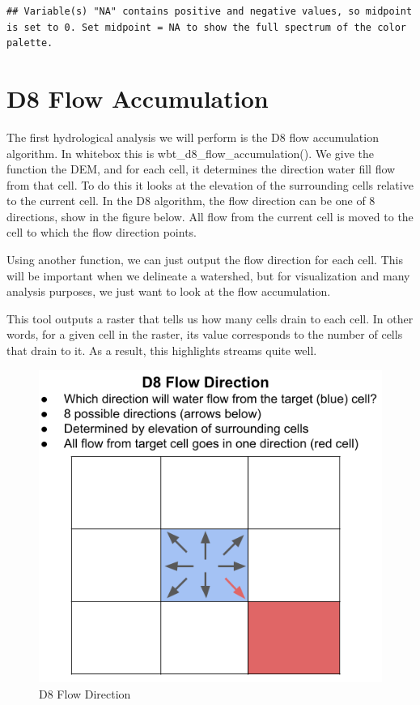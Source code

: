 \documentclass[
]{book}
\begin{document}
\begin{verbatim}
## Variable(s) "NA" contains positive and negative values, so midpoint is set to 0. Set midpoint = NA to show the full spectrum of the color palette.
\end{verbatim}

\hypertarget{d8-flow-accumulation}{%
\section{D8 Flow Accumulation}\label{d8-flow-accumulation}}

The first hydrological analysis we will perform is the D8 flow accumulation algorithm. In whitebox this is wbt\_d8\_flow\_accumulation(). We give the function the DEM, and for each cell, it determines the direction water fill flow from that cell. To do this it looks at the elevation of the surrounding cells relative to the current cell. In the D8 algorithm, the flow direction can be one of 8 directions, show in the figure below. All flow from the current cell is moved to the cell to which the flow direction points.

Using another function, we can just output the flow direction for each cell. This will be important when we delineate a watershed, but for visualization and many analysis purposes, we just want to look at the flow accumulation.

This tool outputs a raster that tells us how many cells drain to each cell. In other words, for a given cell in the raster, its value corresponds to the number of cells that drain to it. As a result, this highlights streams quite well.

\begin{figure}
\centering
\includegraphics{images/D8 flow direction.png}
\caption{D8 Flow Direction}
\end{figure}
\end{document}
